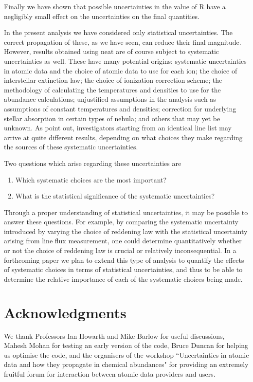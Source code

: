 \documentclass[useAMS,usenatbib]{mn2e}
\begin{document}
Finally we have shown that possible uncertainties in the value of R have a negligibly small effect on the uncertainties on the final quantities.

In the present analysis we have considered only statistical uncertainties.  The correct propagation of these, as we have seen, can reduce their final magnitude.  However, results obtained using {\sc neat} are of course subject to systematic uncertainties as well.  These have many potential origins: systematic uncertainties in atomic data and the choice of atomic data to use for each ion; the choice of interstellar extinction law; the choice of ionization correction scheme; the methodology of calculating the temperatures and densities to use for the abundance calculations; unjustified assumptions in the analysis such as assumptions of constant temperatures and densities; correction for underlying stellar absorption in certain types of nebula; and others that may yet be unknown.  As \citet{2011arXiv1109.2502K} point out, investigators starting from an identical line list may arrive at quite different results, depending on what choices they make regarding the sources of these systematic uncertainties.

Two questions which arise regarding these uncertainties are

\begin{enumerate}
\item Which systematic choices are the most important?
\item What is the statistical significance of the systematic uncertainties?
\end{enumerate}

Through a proper understanding of statistical uncertainties, it may be possible to answer these questions.  For example, by comparing the systematic uncertainty introduced by varying the choice of reddening law with the statistical uncertainty arising from line flux measurement, one could determine quantitatively whether or not the choice of reddening law is crucial or relatively inconsequential.  In a forthcoming paper we plan to extend this type of analysis to quantify the effects of systematic choices in terms of statistical uncertainties, and thus to be able to determine the relative importance of each of the systematic choices being made.

\section*{Acknowledgments}

We thank Professors Ian Howarth and Mike Barlow for useful discussions, Mahesh Mohan for testing an early version of the code, Bruce Duncan for helping us optimise the code, and the organisers of the workshop ``Uncertainties in atomic data and how they propagate in chemical abundances" for providing an extremely fruitful forum for interaction between atomic data providers and users.





\label{lastpage}
\end{document}
